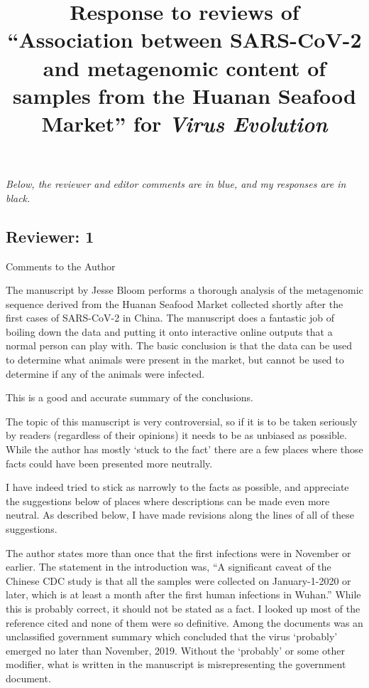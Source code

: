 \documentclass[11pt, oneside]{article}   	%
\title{Response to reviews of ``Association between SARS-CoV-2 and metagenomic content of samples from the Huanan Seafood Market'' for \textit{Virus Evolution}}
\author{}
\newcommand{\response}[1]{{\color{black}#1}}
\begin{document}
\maketitle

\emph{Below, the reviewer and editor comments {\color{blue} are in blue}, and my responses are in black.}

\color{blue}


\subsection*{Reviewer: 1}

Comments to the Author

The manuscript by Jesse Bloom performs a thorough analysis of the metagenomic sequence derived from the Huanan Seafood Market collected shortly after the first cases of SARS-CoV-2 in China.  The manuscript does a fantastic job of boiling down the data and putting it onto interactive online outputs that a normal person can play with.  The basic conclusion is that the data can be used to determine what animals were present in the market, but cannot be used to determine if any of the animals were infected. 

\response{This is a good and accurate summary of the conclusions.} 

The topic of this manuscript is very controversial, so if it is to be taken seriously by readers (regardless of their opinions) it needs to be as unbiased as possible.  While the author has mostly ‘stuck to the fact’ there are a few places where those facts could have been presented more neutrally.

\response{
I have indeed tried to stick as narrowly to the facts as possible, and appreciate the suggestions below of places where descriptions can be made even more neutral.
As described below, I have made revisions along the lines of all of these suggestions.
}

The author states more than once that the first infections were in November or earlier.   The statement in the introduction was, “A significant caveat of the Chinese CDC study is that all the samples were collected on January-1-2020 or later, which is at least a month after the first human infections in Wuhan.”  While this is probably correct, it should not be stated as a fact.  I looked up most of the reference cited and none of them were so definitive.  Among the documents was an unclassified government summary which concluded that the virus ‘probably’ emerged no later than November, 2019.  Without the ‘probably’ or some other modifier, what is written in the manuscript is misrepresenting the government document.
\end{document}
